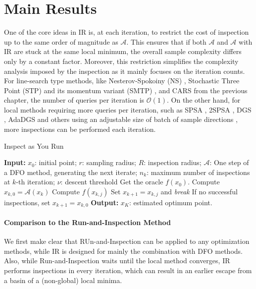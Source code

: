 
\section{Main Results}
One of the core ideas in IR is, at each iteration, to restrict the cost of inspection up to the same order of magnitude as $\mathcal{A}$.
This ensures that if both $\mathcal{A}$ and $\mathcal{A}$ with IR are stuck at the same local minimum, the overall sample complexity differs only by a constant factor.
Moreover, this restriction simplifies the complexity analysis imposed by the inspection as it mainly focuses on the iteration counts.
For line-search type methods, like Nesterov-Spokoiny (NS) \cite{nesterov2017random}, Stochastic Three Point (STP) and its momentum variant (SMTP) \cite{bergou2020stochastic,gorbunov2019stochastic}, and CARS from the previous chapter, the number of queries per iteration is $\mathcal{O}(1)$.
On the other hand, for local methods requiring more queries per iteration, such as SPSA \cite{spall1992multivariate}, 2SPSA \cite{spall2000adaptive}, DGS \cite{zhang2020novel}, AdaDGS \cite{tran2020adadgs} and others using an adjustable size of batch of sample directions \cite{mania2018simple,salimans2017evolution},  more inspections can be performed each iteration.

\begin{algorithm}[H]
    \caption{Inspect as You Run}
     \label{alg:IR general}
    \begin{algorithmic}[1]
      \State \textbf{Input:} $x_0$: initial point; $r$: sampling radius; $R$: inspection radius; $\mathcal{A}$: One step of a DFO method, generating the next iterate; $n_k$: maximum number of inspections at $k$-th iteration; $\nu$: descent threshold
      \State Get the oracle $f(x_0)$.
            \State Compute $x_{k, 0} = \mathcal{A}(x_k)$
                \State Compute $f(x_{k,j})$ 
                    \State Set $x_{k+1} = x_{k,j}$ and \emph{break}
                \EndIf
            \EndFor
            \State If no successful inspections, set $x_{k+1} = x_{k,0}$ \label{eq: inspection step in the algorithm 1}
      \EndFor
       \State \textbf{Output:} $x_K$: estimated optimum point.
    \end{algorithmic}
\end{algorithm}

\paragraph*{Comparison to the Run-and-Inspection Method} We first make clear that RUn-and-Inspection can be applied to any optimization methods, while IR is designed for mainly the combination with DFO methods. Also, while Run-and-Inspection waits until the local method converges, IR performs inspections in every iteration, which can result in an earlier escape from a basin of a (non-global) local minima.

